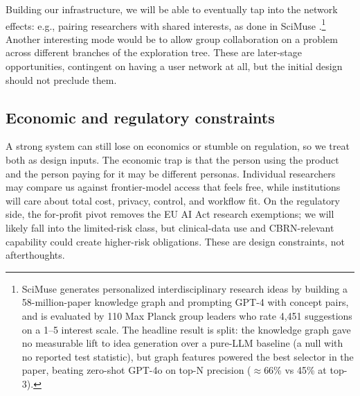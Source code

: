 Building our infrastructure, we will be able to eventually tap into the network effects: e.g., pairing researchers with shared interests, as done in SciMuse \cite{2405.17044}.\footnote{
    SciMuse generates personalized interdisciplinary research ideas by building a 58-million-paper knowledge graph and prompting GPT-4 with concept pairs, and is evaluated by 110 Max Planck group leaders who rate 4,451 suggestions on a 1–5 interest scale. The headline result is split: the knowledge graph gave no measurable lift to idea generation over a pure-LLM baseline (a null with no reported test statistic), but graph features powered the best selector in the paper, beating zero-shot GPT-4o on top-N precision ($\approx$66\% vs 45\% at top-3).
    }
Another interesting mode would be to allow group collaboration on a problem across different branches of the exploration tree. These are later-stage opportunities, contingent on having a user network at all, but the initial design should not preclude them.

\subsection{Economic and regulatory constraints}
\label{section:compliance}

\begin{summarybox}
A strong system can still lose on economics or stumble on regulation, so we treat both as design inputs. The economic trap is that the person using the product and the person paying for it may be different personas. Individual researchers may compare us against frontier-model access that feels free, while institutions will care about total cost, privacy, control, and workflow fit. On the regulatory side, the for-profit pivot removes the EU AI Act research exemptions; we will likely fall into the limited-risk class, but clinical-data use and CBRN-relevant capability could create higher-risk obligations. These are design constraints, not afterthoughts.
\end{summarybox}


